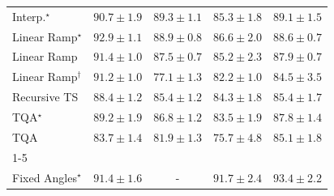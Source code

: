 \begin{tabular}{l|cccc|}
Interp.$^\star$ & {\cellcolor[HTML]{005730}} \color[HTML]{F1F1F1} $90.7\pm 1.9$ & {\cellcolor[HTML]{005F34}} \color[HTML]{F1F1F1} $89.3\pm 1.1$ & {\cellcolor[HTML]{12763D}} \color[HTML]{F1F1F1} $85.3\pm 1.8$ & {\cellcolor[HTML]{006034}} \color[HTML]{F1F1F1} $89.1\pm 1.5$ \\
Linear Ramp$^\star$ & {\cellcolor[HTML]{00482A}} \color[HTML]{F1F1F1} $92.9\pm 1.1$ & {\cellcolor[HTML]{006335}} \color[HTML]{F1F1F1} $88.9\pm 0.8$ & {\cellcolor[HTML]{0A703A}} \color[HTML]{F1F1F1} $86.6\pm 2.0$ & {\cellcolor[HTML]{006435}} \color[HTML]{F1F1F1} $88.6\pm 0.7$ \\
Linear Ramp & {\cellcolor[HTML]{00522E}} \color[HTML]{F1F1F1} $91.4\pm 1.0$ & {\cellcolor[HTML]{036B38}} \color[HTML]{F1F1F1} $87.5\pm 0.7$ & {\cellcolor[HTML]{13773D}} \color[HTML]{F1F1F1} $85.2\pm 2.3$ & {\cellcolor[HTML]{016937}} \color[HTML]{F1F1F1} $87.9\pm 0.7$ \\
Linear Ramp$^\dagger$ & {\cellcolor[HTML]{00532F}} \color[HTML]{F1F1F1} $91.2\pm 1.0$ & {\cellcolor[HTML]{45AD5F}} \color[HTML]{F1F1F1} $77.1\pm 1.3$ & {\cellcolor[HTML]{268846}} \color[HTML]{F1F1F1} $82.2\pm 1.0$ & {\cellcolor[HTML]{177B3F}} \color[HTML]{F1F1F1} $84.5\pm 3.5$ \\
Recursive TS & {\cellcolor[HTML]{006636}} \color[HTML]{F1F1F1} $88.4\pm 1.2$ & {\cellcolor[HTML]{12763D}} \color[HTML]{F1F1F1} $85.4\pm 1.2$ & {\cellcolor[HTML]{187B3F}} \color[HTML]{F1F1F1} $84.3\pm 1.8$ & {\cellcolor[HTML]{12763D}} \color[HTML]{F1F1F1} $85.4\pm 1.7$ \\
TQA$^\star$ & {\cellcolor[HTML]{006034}} \color[HTML]{F1F1F1} $89.2\pm 1.9$ & {\cellcolor[HTML]{086E3A}} \color[HTML]{F1F1F1} $86.8\pm 1.2$ & {\cellcolor[HTML]{1E8041}} \color[HTML]{F1F1F1} $83.5\pm 1.9$ & {\cellcolor[HTML]{016937}} \color[HTML]{F1F1F1} $87.8\pm 1.4$ \\
TQA & {\cellcolor[HTML]{1D7F41}} \color[HTML]{F1F1F1} $83.7\pm 1.4$ & {\cellcolor[HTML]{288A47}} \color[HTML]{F1F1F1} $81.9\pm 1.3$ & {\cellcolor[HTML]{53B466}} \color[HTML]{F1F1F1} $75.7\pm 4.8$ & {\cellcolor[HTML]{14783E}} \color[HTML]{F1F1F1} $85.1\pm 1.8$ \\
\cline{1-5}
\multicolumn{5}{c}{\rule{0pt}{8pt}SV} \\
\midrule
Fixed Angles$^\star$ & {\cellcolor[HTML]{03456C}} \color[HTML]{F1F1F1} $91.4\pm 1.6$ & {\cellcolor[HTML]{000000}} \color[HTML]{F1F1F1} {\cellcolor{white}} \color{black} - & {\cellcolor[HTML]{034369}} \color[HTML]{F1F1F1} $91.7\pm 2.4$ & {\cellcolor[HTML]{023858}} \color[HTML]{F1F1F1} $93.4\pm 2.2$ \\

\end{tabular}
